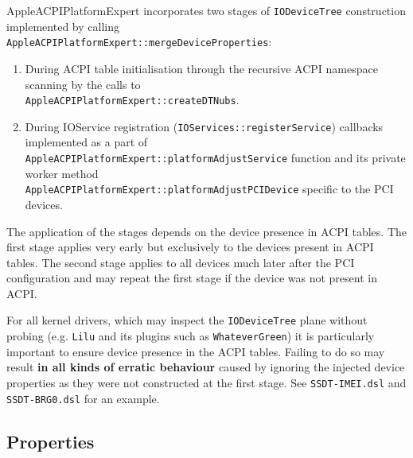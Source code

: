 \documentclass[]{article}
\providecommand{\tightlist}{%
  \setlength{\itemsep}{0pt}\setlength{\parskip}{0pt}}
\begin{document}
AppleACPIPlatformExpert incorporates two stages of \texttt{IODeviceTree}
construction implemented by calling \\
\texttt{AppleACPIPlatformExpert::mergeDeviceProperties}:

\begin{enumerate}
  \tightlist
  \item During ACPI table initialisation through the recursive ACPI namespace scanning
  by the calls to \\
  \texttt{AppleACPIPlatformExpert::createDTNubs}.
  \item During IOService registration (\texttt{IOServices::registerService}) callbacks
  implemented as a part of \\
  \texttt{AppleACPIPlatformExpert::platformAdjustService}
  function and its private worker method \\
  \texttt{AppleACPIPlatformExpert::platformAdjustPCIDevice}
  specific to the PCI devices.
\end{enumerate}

The application of the stages depends on the device presence in ACPI tables.
The first stage applies very early but exclusively to the devices present in ACPI tables.
The second stage applies to all devices much later after the PCI configuration
and may repeat the first stage if the device was not present in ACPI.

For all kernel drivers, which may inspect the \texttt{IODeviceTree} plane without
probing (e.g. \texttt{Lilu} and its plugins such as \texttt{WhateverGreen}) it is particularly
important to ensure device presence in the ACPI tables. Failing to do so may result
\textbf{in all kinds of erratic behaviour} caused by ignoring the injected device properties
as they were not constructed at the first stage. See \texttt{SSDT-IMEI.dsl} and
\texttt{SSDT-BRG0.dsl} for an example.

\subsection{Properties}\label{devpropsprops}
\end{document}
